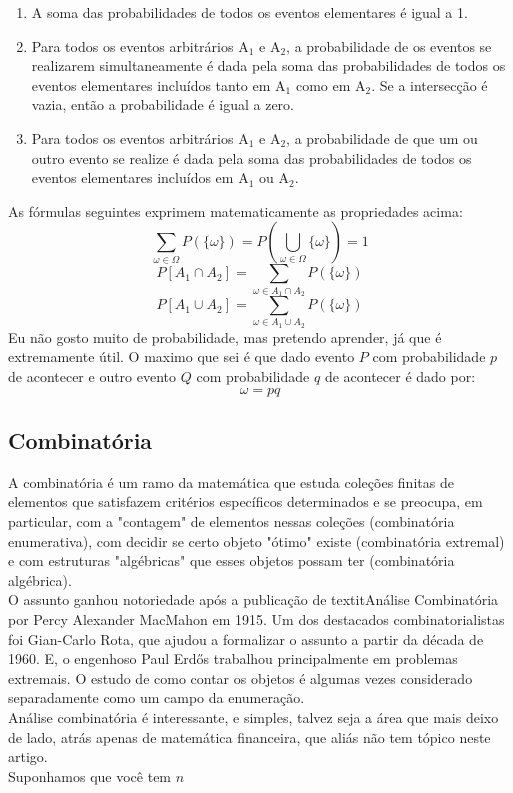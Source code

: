 \documentclass{article}
\begin{document}
    \begin{enumerate}
        \item A soma das probabilidades de todos os eventos elementares é igual a 1.
        \item Para todos os eventos arbitrários A$_1$ e A$_2$, a probabilidade de os eventos se realizarem simultaneamente é dada pela soma das probabilidades de todos os eventos elementares incluídos tanto em A$_1$ como em A$_2$. Se a intersecção é vazia, então a probabilidade é igual a zero.
        \item Para todos os eventos arbitrários A$_1$ e A$_2$, a probabilidade de que um ou outro evento se realize é dada pela soma das probabilidades de todos os eventos elementares incluídos em A$_1$ ou A$_2$.
    \end{enumerate}
    
    As fórmulas seguintes exprimem matematicamente as propriedades acima:\cite{probabilidade}
    \[
        \sum_{\omega \in \Omega}P(\{\omega\})=P\left(\bigcup_{\omega \in \Omega} \{\omega\}\right)=1
    \]
    \[
        P[A_1 \cap A_2] = \sum_{\omega \in A_1 \cap A_2} P(\{\omega\})
    \]
    \[
        P[A_1 \cup A_2] = \sum_{\omega \in A_1 \cup A_2} P(\{\omega\})
    \]
    Eu não gosto muito de probabilidade, mas pretendo aprender, já que é extremamente útil. O maximo que sei é que dado evento $P$ com probabilidade $p$ de acontecer e outro evento $Q$ com probabilidade $q$ de acontecer é dado por:
    \[
        \omega = pq
    \]
    \subsection{Combinatória}
    A combinatória é um ramo da matemática que estuda coleções finitas de elementos que satisfazem critérios específicos determinados e se preocupa, em particular, com a "contagem" de elementos nessas coleções (combinatória enumerativa), com decidir se certo objeto "ótimo" existe (combinatória extremal) e com estruturas "algébricas" que esses objetos possam ter (combinatória algébrica).
    \\O assunto ganhou notoriedade após a publicação de textit{Análise Combinatória} por Percy Alexander MacMahon em 1915. Um dos destacados combinatorialistas foi Gian-Carlo Rota, que ajudou a formalizar o assunto a partir da década de 1960. E, o engenhoso Paul Erdős trabalhou principalmente em problemas extremais. O estudo de como contar os objetos é algumas vezes considerado separadamente como um campo da enumeração.\cite{combinatoria}
    \\Análise combinatória é interessante, e simples, talvez seja a área que mais deixo de lado, atrás apenas de matemática financeira, que aliás não tem tópico neste artigo.
    \\Suponhamos que você tem $n$ 
\end{document}
